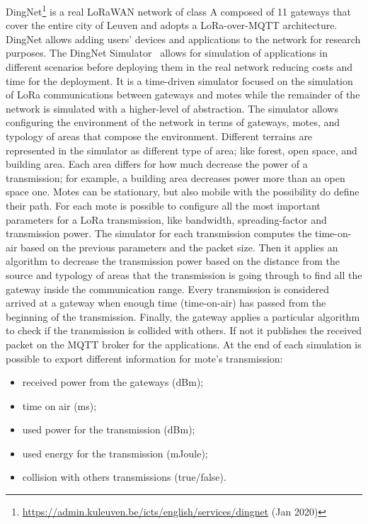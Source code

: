 DingNet\footnote{\href{https://admin.kuleuven.be/icts/english/services/dingnet}{https://admin.kuleuven.be/icts/english/services/dingnet} (Jan 2020)} is a real LoRaWAN network of class A composed of 11 gateways that cover the entire city of Leuven and adopts a LoRa-over-MQTT architecture. 
% 
DingNet allows adding users' devices and applications to the network for research purposes.
% 
The DingNet Simulator~\cite{inproceedings} allows for simulation of applications in different scenarios before deploying them in the real network reducing costs and time for the deployment.
% 
It is a time-driven simulator focused on the simulation of LoRa communications between gateways and motes while the remainder of the network is simulated with a higher-level of abstraction. 
% 
The simulator allows configuring the environment of the network in terms of gateways, motes, and typology of areas that compose the environment. 
% 
Different terrains are represented in the simulator as different type of area; like forest, open space, and building area. 
Each area differs for how much decrease the power of a transmission; for example, a building area decreases power more than an open space one.
% 
Motes can be stationary, but also mobile with the possibility do define their path.
% 
For each mote is possible to configure all the most important parameters for a LoRa transmission, like bandwidth, spreading-factor and transmission power. 
% 
The simulator for each transmission computes the time-on-air based on the previous parameters and the packet size. 
% 
Then it applies an algorithm to decrease the transmission power based on the distance from the source and typology of areas that the transmission is going through to find all the gateway inside the communication range.
% 
Every transmission is considered arrived at a gateway when enough time (time-on-air) has passed from the beginning of the transmission. 
Finally, the gateway applies a particular algorithm to check if the transmission is collided with others. If not it publishes the received packet on the MQTT broker for the applications.
%
At the end of each simulation is possible to export different information for mote's transmission:
\begin{itemize}
    \item received power from the gateways (dBm);
    \item time on air (ms);
    \item used power for the transmission (dBm);
    \item used energy for the transmission (mJoule);
    \item collision with others transmissions (true/false).
\end{itemize}

